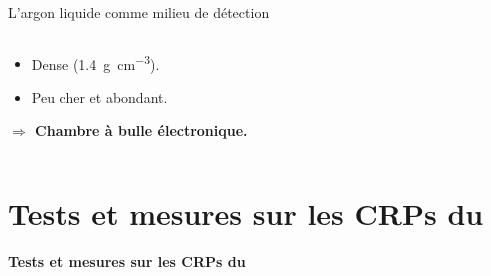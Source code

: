 \begin{frame}{L'argon liquide comme milieu de détection}
\begin{scriptsize}
\begin{columns}
\begin{column}{0.4\textwidth}
\begin{itemize}
       				\item Dense (\SI{1.4}{\gram\per\centi\meter^3}).
       				\item Peu cher et abondant.
       			\end{itemize}
       			\begin{footnotesize}
   	    			\textbf{$\Rightarrow$ Chambre à bulle électronique.}
   	    		\end{footnotesize}
       		\end{column}
       	\end{columns}
 	  \end{scriptsize}
    \end{frame}

  {
    	\setlength\pdfpagewidth{12.8cm}%
    	\setlength\pdfpageheight{9.15cm}%
    	\begin{frame}[plain]
    	\end{frame}
    }
    
    \section[Tests des CRPs]{Tests et mesures sur les CRPs du \SSS{}}

    {
        \begin{specialframe}
            \vspace{2cm}\hspace*{-1.8cm}\parbox[t]{\textwidth}{
                \begin{center}
                    \begin{Huge}
                            \textcolor{pheniics_purple}{\textbf{Tests et mesures sur les CRPs du \SSS{}}}
                    \end{Huge}
                \end{center}
            }
        \end{specialframe}
    }

